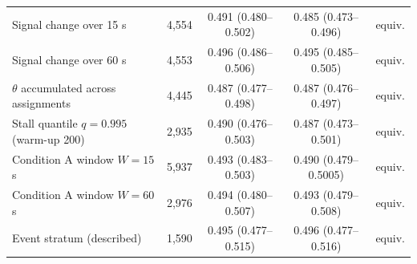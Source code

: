 \begin{table}
\begin{tabularx}{\linewidth}{>{\raggedright\arraybackslash}X r c c l}
    Signal change over 15 s & 4,554 & 0.491 (0.480--0.502) & 0.485 (0.473--0.496) & equiv. \\
    Signal change over 60 s & 4,553 & 0.496 (0.486--0.506) & 0.495 (0.485--0.505) & equiv. \\
    $\theta$ accumulated across assignments & 4,445 & 0.487 (0.477--0.498) & 0.487 (0.476--0.497) & equiv. \\
    Stall quantile $q = 0.995$ (warm-up 200) & 2,935 & 0.490 (0.476--0.503) & 0.487 (0.473--0.501) & equiv. \\
    Condition A window $W = 15$ s & 5,937 & 0.493 (0.483--0.503) & 0.490 (0.479--0.5005) & equiv. \\
    Condition A window $W = 60$ s & 2,976 & 0.494 (0.480--0.507) & 0.493 (0.479--0.508) & equiv. \\
    Event stratum (described) & 1,590 & 0.495 (0.477--0.515) & 0.496 (0.477--0.516) & equiv. \\
    \bottomrule
  \end{tabularx}
\end{table}

